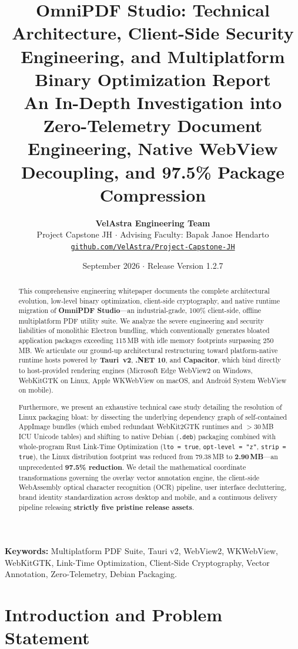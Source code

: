 \documentclass[11pt,a4paper]{article}
\title{\textbf{\LARGE OmniPDF Studio: Technical Architecture, Client-Side Security Engineering, and Multiplatform Binary Optimization Report}\\[0.4em]
\large An In-Depth Investigation into Zero-Telemetry Document Engineering, Native WebView Decoupling, and 97.5\% Package Compression}
\author{\textbf{VelAstra Engineering Team}\\
Project Capstone JH \quad $\cdot$ \quad Advising Faculty: Bapak Janoe Hendarto\\
\texttt{\href{https://github.com/VelAstra/Project-Capstone-JH}{github.com/VelAstra/Project-Capstone-JH}}}
\date{September 2026 \quad $\cdot$ \quad Release Version 1.2.7}
\begin{document}
\maketitle

\begin{abstract}
This comprehensive engineering whitepaper documents the complete architectural evolution, low-level binary optimization, client-side cryptography, and native runtime migration of \textbf{OmniPDF Studio}---an industrial-grade, 100\% client-side, offline multiplatform PDF utility suite. We analyze the severe engineering and security liabilities of monolithic Electron bundling, which conventionally generates bloated application packages exceeding 115\,MB with idle memory footprints surpassing 250\,MB. We articulate our ground-up architectural restructuring toward platform-native runtime hosts powered by \textbf{Tauri~v2}, \textbf{.NET 10}, and \textbf{Capacitor}, which bind directly to host-provided rendering engines (Microsoft Edge WebView2 on Windows, WebKitGTK on Linux, Apple WKWebView on macOS, and Android System WebView on mobile). 

Furthermore, we present an exhaustive technical case study detailing the resolution of Linux packaging bloat: by dissecting the underlying dependency graph of self-contained AppImage bundles (which embed redundant WebKit2GTK runtimes and $>30$\,MB ICU Unicode tables) and shifting to native Debian (\texttt{.deb}) packaging combined with whole-program Rust Link-Time Optimization (\texttt{lto = true}, \texttt{opt-level = "z"}, \texttt{strip = true}), the Linux distribution footprint was reduced from 79.38\,MB to \textbf{2.90\,MB}---an unprecedented \textbf{97.5\% reduction}. We detail the mathematical coordinate transformations governing the overlay vector annotation engine, the client-side WebAssembly optical character recognition (OCR) pipeline, user interface decluttering, brand identity standardization across desktop and mobile, and a continuous delivery pipeline releasing \textbf{strictly five pristine release assets}.
\end{abstract}

\vspace{1em}
\noindent\textbf{Keywords:} Multiplatform PDF Suite, Tauri v2, WebView2, WKWebView, WebKitGTK, Link-Time Optimization, Client-Side Cryptography, Vector Annotation, Zero-Telemetry, Debian Packaging.

\section{Introduction and Problem Statement}
\label{sec:intro}
\end{document}
